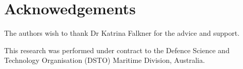 \documentclass{llncs}
\newcommand{\starpar}[1]{\par{\footnotesize $\star$ \hl{#1}\par}}
\begin{document}
\section{Acknowedgements}
The authors wish to thank Dr Katrina Falkner for the advice and support.

This research was performed under contract to the Defence
Science and Technology Organisation (DSTO) Maritime Division,
Australia.




\end{document}
